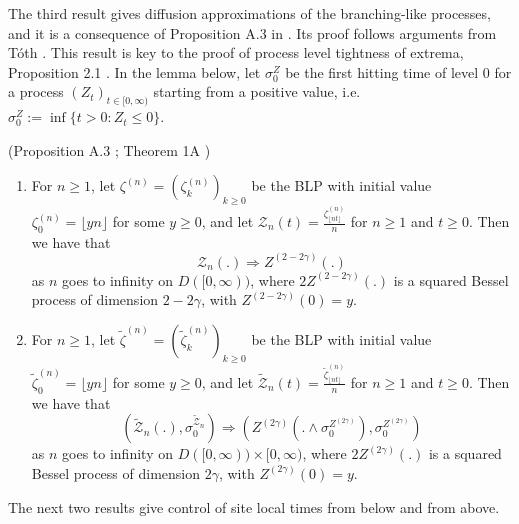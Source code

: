 \documentclass[EJP]{ejpecp} %
\begin{document}
The third result gives diffusion approximations of the branching-like processes, and it is a consequence of Proposition A.3 in \cite{KMP23}. Its proof follows arguments from T\'{o}th \cite{T96}. This result is key to the proof of process level tightness of extrema, Proposition 2.1 \cite{KMP23}. 
In the lemma below, let $\sigma_0^Z$ be the first hitting time of level $0$ for a process $\left( Z_t \right) _{t \in [0,\infty )}$ starting from a positive value, i.e. $\sigma_0^Z := \inf \{t>0: Z_t \le 0\} $.
\begin{lemma}(Proposition A.3 \cite{KMP23}; Theorem 1A \cite{T96})\label{lm: diffusion approximation of blp}
	\begin{enumerate}
		\item 
		For $n\geq 1$, let $\zeta^{(n)}=(\zeta^{(n)}_k)_{k\geq 0 }  $ be the BLP with initial value $\zeta^{(n)}_0 = \lfloor yn \rfloor$ for some $y \geq 0$, and let $\mathcal{Z}_n(t) = \frac{\zeta^{(n)}_{\lfloor nt \rfloor}}{n}$ for $n\geq 1$ and $t\geq 0$. Then we have that 
		\[
		\mathcal{Z}_n(.) \Longrightarrow Z^{(2-2\gamma)}(.)
		\] 
		as $n$ goes to infinity on $D([0,\infty))$, where $2Z^{(2-2\gamma)}(.)$ is a squared Bessel process of dimension $2-2\gamma$, with $Z^{(2 - 2 \gamma)}(0) = y$.
		
		\item
		For $n\geq 1$, let $\tilde\zeta^{(n)}=(\tilde\zeta^{(n)}_k)_{k\geq 0 }  $ be the BLP with initial value $\tilde\zeta^{(n)}_0 = \lfloor yn \rfloor$ for some $y \geq 0$, and let $\tilde{\mathcal{Z}}_n(t) = \frac{\tilde\zeta^{(n)}_{\lfloor nt \rfloor}}{n}$ for $n\geq 1$ and $t\geq 0$. Then we have that 
		\[
		\left(\tilde{\mathcal{Z}}_n(.), \sigma_0^{\tilde{\mathcal{Z}}_n}\right) 
		\Longrightarrow \left(Z^{(2\gamma)}(. \wedge \sigma_0^{Z^{(2 \gamma)}}), \sigma_0^{Z^{(2 \gamma)}}\right)
		\]
		as $n$ goes to infinity on $D([0,\infty)) \times [0,\infty )$, where $2Z^{(2\gamma)}(.)$ is a squared Bessel process of dimension $2\gamma$, with $Z^{( 2 \gamma)}(0) = y$.
	\end{enumerate}
	
	
\end{lemma}


The next two results give control of site local times from below and from above.
\end{document}
